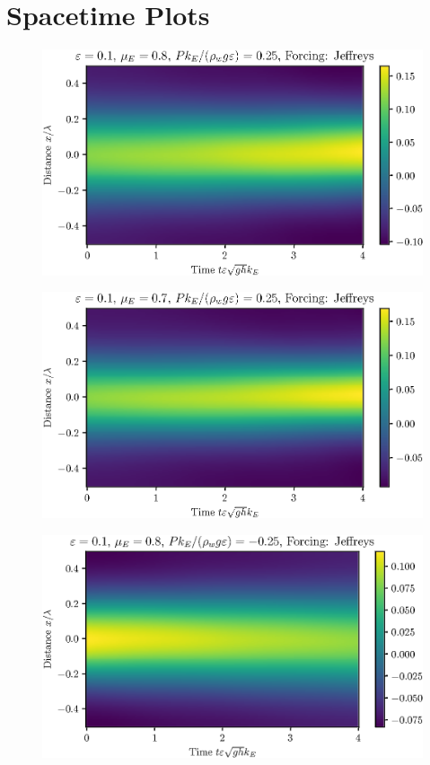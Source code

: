 \documentclass{jfm}
\let\Oldsection\section
\renewcommand{\section}{\FloatBarrier\Oldsection}
\begin{document}
\section{Spacetime Plots}
\begin{figure}
  \centering
  \includegraphics{Spacetime-Mesh.eps}
  \caption{}
\end{figure}

\begin{figure}
  \centering
  \includegraphics{Spacetime-Mesh_double_mu.eps}
  \caption{}
\end{figure}

\begin{figure}
  \centering
  \includegraphics{Spacetime-Mesh_neg.eps}
  \caption{}
\end{figure}
\end{document}
